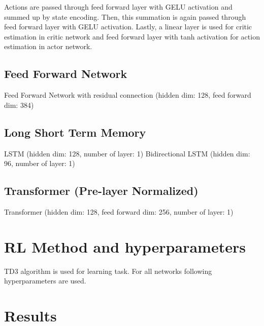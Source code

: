 Actions are passed through feed forward layer with GELU activation and summed up by state encoding. Then, this summation is again passed through feed forward layer with GELU activation. Lastly, a linear layer is used for critic estimation in critic network and feed forward layer with tanh activation for action estimation in actor network.

\subsection{Feed Forward Network}
Feed Forward Network with residual connection (hidden dim: 128, feed forward dim: 384)
\subsection{Long Short Term Memory}
LSTM (hidden dim: 128, number of layer: 1)
Bidirectional LSTM (hidden dim: 96, number of layer: 1)
\subsection{Transformer (Pre-layer Normalized)}
Transformer (hidden dim: 128, feed forward dim: 256, number of layer: 1)

\section{RL Method and hyperparameters}
TD3 algorithm is used for learning task. For all networks following hyperparameters are used.\\

\section{Results}